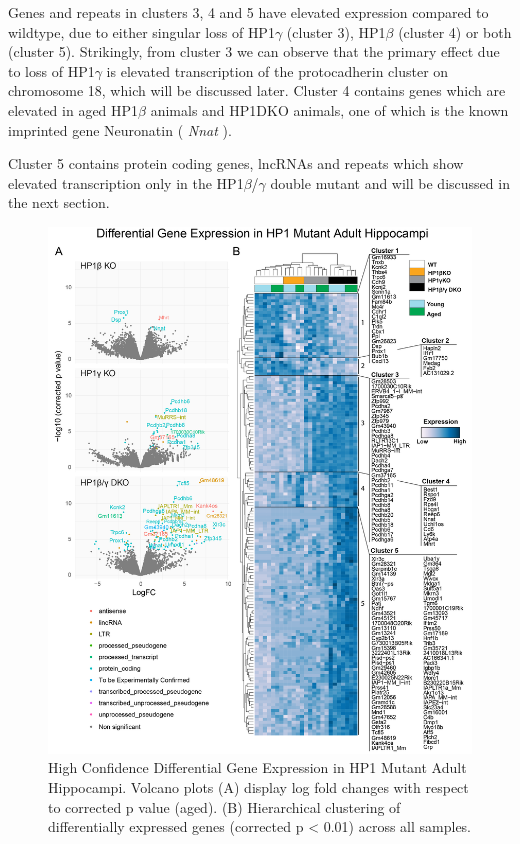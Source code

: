 \documentclass[onehalf,12pt]{beavtex}
\begin{document}
  Genes and repeats in clusters 3, 4 and 5 have elevated expression
  compared to wildtype, due to either singular loss of HP1\(\gamma\)
  (cluster 3), HP1\(\beta\) (cluster 4) or both (cluster 5). Strikingly,
  from cluster 3 we can observe that the primary effect due to loss of
  HP1\(\gamma\) is elevated transcription of the protocadherin cluster on
  chromosome 18, which will be discussed later. Cluster 4 contains genes
  which are elevated in aged HP1\(\beta\) animals and HP1DKO animals, one
  of which is the known imprinted gene Neuronatin ( \emph{Nnat} ).
  
  Cluster 5 contains protein coding genes, lncRNAs and repeats which show
  elevated transcription only in the HP1\(\beta\)/\(\gamma\) double mutant
  and will be discussed in the next section.
  
  \begin{figure}
  
  {\centering \includegraphics[width=1\linewidth, ]{./figure/results/RNA_summary} 
  
  }
  
  \caption[High Confidence Differential Gene Expression in HP1 Mutant Adult Hippocampi]{High Confidence Differential Gene Expression in HP1 Mutant Adult Hippocampi. Volcano plots (A) display log fold changes with respect to corrected p value (aged).  (B) Hierarchical clustering of differentially expressed genes (corrected p < 0.01)  across all samples.}\label{fig:RNAsum}
  \end{figure}
  
\end{document}
